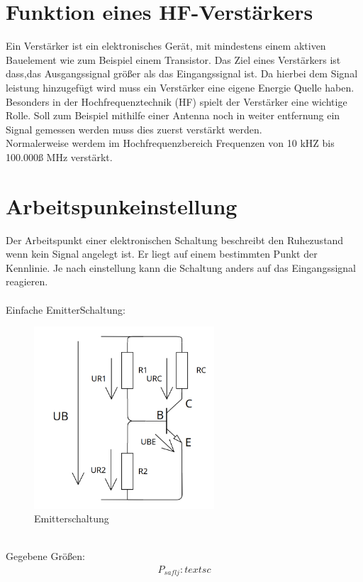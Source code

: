 

\section{Funktion eines HF-Verstärkers}
Ein Verstärker ist ein elektronisches Gerät, mit mindestens einem 
aktiven Bauelement wie zum Beispiel einem Transistor.
Das Ziel eines Verstärkers ist dass,das Ausgangssignal 
größer als das Eingangssignal ist. Da hierbei dem Signal leistung hinzugefügt
wird muss ein Verstärker eine eigene Energie Quelle haben.
\\
Besonders in der Hochfrequenztechnik (HF) spielt der Verstärker eine wichtige
Rolle. Soll zum Beispiel mithilfe einer Antenna noch in weiter entfernung ein Signal
gemessen werden muss dies zuerst verstärkt werden.
\\
Normalerweise werdem im Hochfrequenzbereich Frequenzen von 10 kHZ bis 100.000ß MHz
verstärkt.
\clearpage
\section{Arbeitspunkeinstellung}
Der Arbeitspunkt einer elektronischen Schaltung beschreibt den 
Ruhezustand wenn kein Signal angelegt ist.
Er liegt auf einem bestimmten Punkt der Kennlinie.
Je nach einstellung kann die Schaltung anders auf das Eingangssignal
reagieren.
\\
\\
Einfache EmitterSchaltung:
\begin{figure}[h]
    \centering
    \includegraphics[width=0.6\textwidth]{Pictures/EmitterSchaltung.png}
    \caption{Emitterschaltung}
\end{figure}
\\
Gegebene Größen:
\begin{align}
    P_{saflj} : textsc
\end{align}
